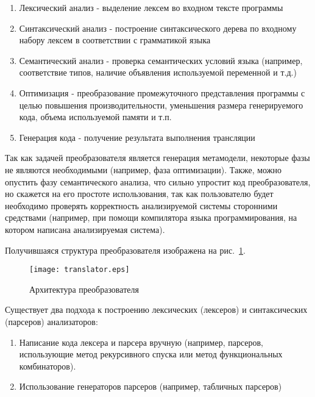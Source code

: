 \begin{enumerate}
    \item Лексический анализ - выделение лексем во входном тексте программы
    \item Синтаксический анализ - построение синтаксического дерева по входному
    набору лексем в соответствии с грамматикой языка
    \item Семантический анализ - проверка семантических условий языка (например,
    соответствие типов, наличие объявления используемой переменной и т.д.)
    \item Оптимизация - преобразование промежуточного представления программы
    с целью повышения производительности, уменьшения размера генерируемого кода,
    объема используемой памяти и т.п.
    \item Генерация кода - получение результата выполнения трансляции
\end{enumerate}

Так как задачей преобразователя является генерация метамодели, некоторые фазы не
являются необходимыми (например, фаза оптимизации). Также, можно опустить фазу
семантического анализа, что сильно упростит код преобразователя, но скажется на
его простоте использования, так как пользователю будет необходимо проверять
корректность анализируемой системы сторонними средствами (например, при помощи
компилятора языка программирования, на котором написана анализируемая система).

Получившаяся структура преобразователя изображена на рис.~\ref{fig:translator}.

\begin{figure}[!h]
    \begin{center}
        \texttt{[image: translator.eps]}
    \end{center}
    \caption{Архитектура преобразователя}
    \label{fig:translator}
\end{figure}

Существует два подхода к построению лексических (лексеров) и синтаксических
(парсеров) анализаторов:

\begin{enumerate}
    \item Написание кода лексера и парсера вручную (например, парсеров,
    использующие метод рекурсивного спуска или метод функциональных
    комбинаторов).
    \item Использование генераторов парсеров (например, табличных парсеров)
\end{enumerate}

